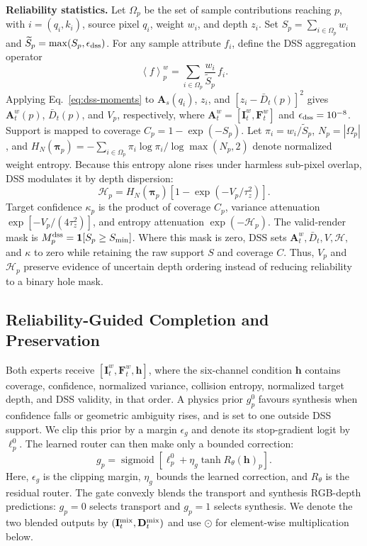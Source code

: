 \documentclass[letterpaper,10pt,conference]{ieeeconf}
\newcommand{\I}{\mathbf{I}}
\newcommand{\D}{\mathbf{D}}
\newcommand{\F}{\mathbf{F}}
\newcommand{\od}{\mathbin{\odot}}
\begin{document}
\noindent\textbf{Reliability statistics.}
Let $\Omega_p$ be the set of sample contributions reaching $p$, with
$i=(q_i,k_i)$, source pixel $q_i$, weight $w_i$, and depth $z_i$. Set
$S_p=\sum_{i\in\Omega_p}w_i$ and
$\widetilde S_p=\max(S_p,\epsilon_{\rm dss})$. For any sample attribute $f_i$,
define the DSS aggregation operator
\begin{equation}
 \left\langle f\right\rangle_p^w
 =\sum_{i\in\Omega_p}\frac{w_i}{\widetilde S_p}\,f_i.
\label{eq:dss-moments}
\end{equation}
Applying Eq.~\eqref{eq:dss-moments} to $\mathbf A_s(q_i)$, $z_i$, and
$[z_i-\bar D_t(p)]^2$ gives $\mathbf A_t^w(p)$, $\bar D_t(p)$, and $V_p$,
respectively, where $\mathbf A_t^w=[\I_t^w,\F_t^w]$ and
$\epsilon_{\rm dss}=10^{-8}$. Support is mapped to coverage
$C_p=1-\exp(-S_p)$. Let $\pi_i=w_i/\widetilde S_p$, $N_p=|\Omega_p|$, and
$H_N(\boldsymbol\pi_p)=-\sum_{i\in\Omega_p}\pi_i\log\pi_i/
\log\max(N_p,2)$ denote normalized weight entropy. Because this entropy alone
rises under harmless sub-pixel overlap, DSS modulates it by depth dispersion:
\begin{equation}
 \mathcal H_p=H_N(\boldsymbol\pi_p)
 \left[1-\exp(-V_p/\tau_z^2)\right].
\label{eq:collision-entropy}
\end{equation}
Target confidence $\kappa_p$ is the product of coverage $C_p$, variance
attenuation $\exp[-V_p/(4\tau_z^2)]$, and entropy attenuation
$\exp(-\mathcal H_p)$. The valid-render mask is
$M_p^{\rm dss}=\mathbf 1[S_p\geq S_{\min}]$. Where this mask is zero, DSS
sets $\mathbf A_t^w,\bar D_t,V,\mathcal H,$ and $\kappa$ to zero while
retaining the raw support $S$ and coverage $C$. Thus, $V_p$ and
$\mathcal H_p$ preserve evidence of uncertain depth ordering instead of
reducing reliability to a binary hole mask.

\subsection{Reliability-Guided Completion and Preservation}

Both experts receive $[\I_t^w,\F_t^w,\mathbf h]$, where the six-channel
condition $\mathbf h$ contains coverage, confidence, normalized variance,
collision entropy, normalized target depth, and DSS validity, in that order.
A physics prior $g_p^0$ favours synthesis when confidence falls or geometric
ambiguity rises, and is set to one outside DSS support. We clip this prior by
a margin $\epsilon_g$ and denote its stop-gradient logit by $\ell_p^0$. The
learned router can then make only a bounded correction:
\begin{equation}
 g_p=\operatorname{sigmoid}\!\left[
 \ell_p^0+\eta_g\tanh R_\theta(\mathbf h)_p\right].
\label{eq:router}
\end{equation}
Here, $\epsilon_g$ is the clipping margin, $\eta_g$ bounds the learned
correction, and $R_\theta$ is the residual router. The gate convexly blends
the transport and synthesis RGB-depth predictions: $g_p=0$ selects transport
and $g_p=1$ selects synthesis. We denote the two blended outputs by
$(\I_t^{\rm mix},\D_t^{\rm mix})$ and use $\od$ for element-wise
multiplication below.
\end{document}
